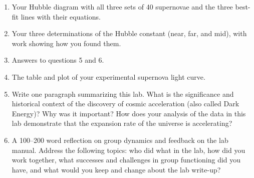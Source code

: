 \begin{enumerate}
	\item Your Hubble diagram with all three sets of 40 supernovae and the three best-fit lines with their equations.
	
	\item Your three determinations of the Hubble constant (near, far, and mid), with work showing how you found them.
	
	\item Answers to questions 5 and 6.
	
	\item The table and plot of your experimental supernova light curve.
	
	\item Write
	one paragraph summarizing this lab. What is the significance and
	historical context of the discovery of cosmic acceleration (also called
	Dark Energy)? Why was it important? How does your analysis of the
	data in this lab demonstrate that the expansion rate of the universe is
	accelerating?
	
	\item A 100--200 word reflection on group dynamics and feedback on the lab manual. Address the following topics: who did what in the lab, how did you work together, what successes and challenges in group functioning did you have, and what would you keep and change about the lab write-up?
\end{enumerate}

